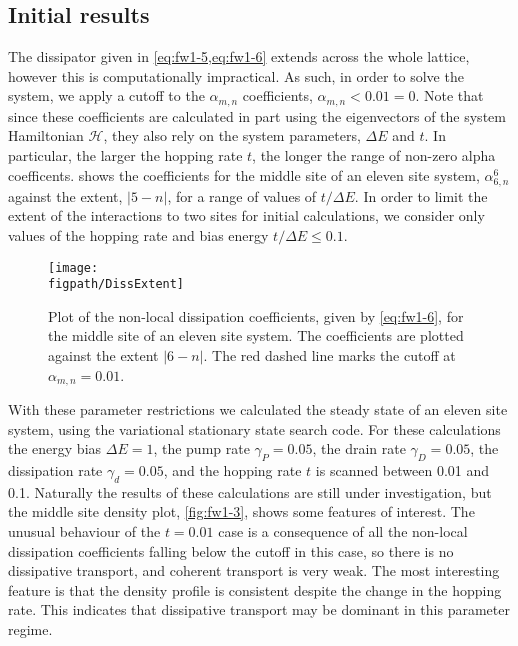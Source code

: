 \subsection{Initial results}
The dissipator given in \cref{eq:fw1-5,eq:fw1-6} extends across the whole lattice, however this is computationally impractical. As such, in order to solve the system, we apply a cutoff to the \(\alpha_{m,n}\) coefficients, \(\alpha_{m,n} < 0.01 = 0\). Note that since these coefficients are calculated in part using the eigenvectors of the system Hamiltonian \(\mathcal{H}\), they also rely on the system parameters, \(\Delta E\) and \(t\). In particular, the larger the hopping rate \(t\), the longer the range of non-zero alpha coefficents.  shows the coefficients for the middle site of an eleven site system, \(\alpha_{6,n}^{6}\) against the extent, \(|5-n|\), for a range of values of \( t / \Delta E\). In order to limit the extent of the interactions to two sites for initial calculations, we consider only values of the hopping rate and bias energy \(t / \Delta E \leq 0.1\). 

\begin{figure}[ht!]
	\centering
	\texttt{[image: \\figpath/DissExtent]}
	\caption{\label{fig:fw1-2}Plot of the non-local dissipation coefficients, given by \cref{eq:fw1-6}, for the middle site of an eleven site system. The coefficients are plotted against the extent \(|6-n|\). The red dashed line marks the cutoff at \(\alpha_{m,n} = 0.01\).}
\end{figure}

With these parameter restrictions we calculated the steady state of an eleven site system, using the variational stationary state search code. For these calculations the energy bias \(\Delta E = 1\), the pump rate \(\gamma_{P} = 0.05\), the drain rate \(\gamma_{D} = 0.05\), the dissipation rate \(\gamma_{d} = 0.05\), and the hopping rate \(t\) is scanned between 0.01 and 0.1. Naturally the results of these calculations are still under investigation, but the middle site density plot, \cref{fig:fw1-3}, shows some features of interest. The unusual behaviour of the \(t=0.01\) case is a consequence of all the non-local dissipation coefficients falling below the cutoff in this case, so there is no dissipative transport, and coherent transport is very weak. The most interesting feature is that the density profile is consistent despite the change in the hopping rate. This indicates that dissipative transport may be dominant in this parameter regime.
 
